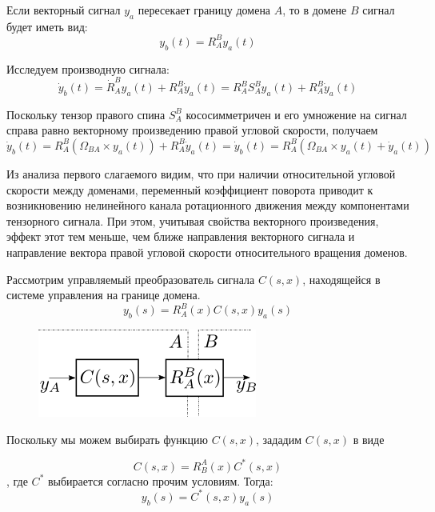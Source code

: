 \documentclass[a4paper]{article}
\begin{document}
Если векторный сигнал $y_a$ пересекает границу домена $A$, то в домене $B$ сигнал будет иметь вид:
\begin{equation} y_b(t) = R_A^B y_a(t) \end{equation}

Исследуем производную сигнала:
\begin{equation} \dot{y}_b(t) = \dot{R}_A^B y_a(t) + R_A^B \dot{y}_a(t) = 
R_A^B S_A^B y_a(t) + R_A^B \dot{y}_a(t) \end{equation}

Поскольку тензор правого спина $S_A^B$ кососимметричен и его умножение на сигнал справа равно векторному произведению правой угловой скорости, получаем
\begin{equation} \dot{y}_b(t) = R_A^B (\Omega_{BA} \times y_a(t)) + R_A^B \dot{y}_a(t) = \dot{y}_b(t) = R_A^B(\Omega_{BA} \times y_a(t) + \dot{y}_a(t))\end{equation}

Из анализа первого слагаемого видим, что при наличии относительной угловой скорости между доменами, переменный коэффициент поворота приводит к возникновению нелинейного канала ротационного движения между компонентами тензорного сигнала. При этом, учитывая свойства векторного произведения, эффект этот тем меньше, чем ближе направления векторного сигнала и направление вектора правой угловой скорости относительного вращения доменов.  

Рассмотрим управляемый преобразователь сигнала $C(s,x)$, находящейся в системе управления на границе домена.
\begin{equation} y_b(s) = R_A^B(x) C(s,x) y_a(s) \end{equation}

{
\begin{figure}[H]
\centering
\includegraphics{./src/domens.png}
\end{figure}
}

Поскольку мы можем выбирать функцию $C(s,x)$, зададим $C(s,x)$ в виде

\begin{equation} \label{kcomp} C(s,x) = R_B^A(x) C^*(s,x) \end{equation}
, где $C^*$ выбирается согласно прочим условиям. Тогда:
\begin{equation} y_b(s) = C^*(s,x) y_a(s) \end{equation} 
\end{document}

